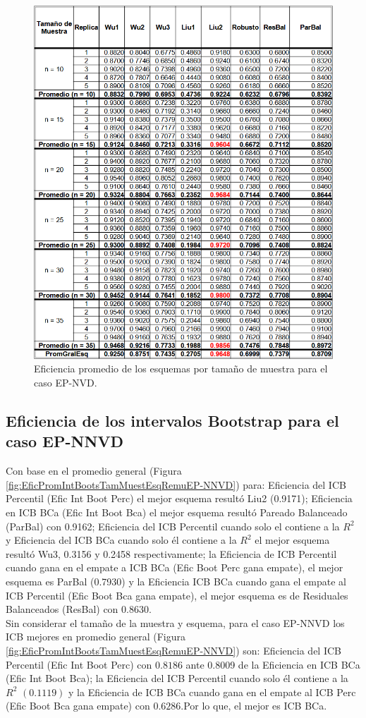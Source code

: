 \begin{figure}[ht] 
	\centering 
	\includegraphics[width=0.70\linewidth]{img/EP_NVD_Efic_Esq.png} 
	\caption{Eficiencia promedio de los esquemas por tamaño de muestra para el caso EP-NVD.} 
	\label{fig:EficPromEsqTamMuesEsqRemuEP-NVD}
\end{figure}
\FloatBarrier



\subsection{Eficiencia de los intervalos Bootstrap para el caso EP-NNVD}
Con base en el promedio general (Figura \ref{fig:EficPromIntBootsTamMuestEsqRemuEP-NNVD}) para: Eficiencia del ICB Percentil (Efic Int Boot Perc) el mejor esquema resultó Liu2 (0.9171); 
Eficiencia en ICB BCa (Efic Int Boot Bca) el mejor esquema resultó Pareado Balanceado (ParBal) con 0.9162;
 Eficiencia del ICB Percentil cuando solo el contiene a la $R^{2}$ y Eficiencia del ICB BCa cuando solo él contiene a la $R^{2}$ el mejor esquema resultó Wu3, 0.3156 y 0.2458 respectivamente;
 la Eficiencia de ICB Percentil cuando gana en el empate a ICB BCa (Efic Boot Perc gana empate), el mejor esquema es ParBal (0.7930) y la Eficiencia ICB BCa cuando gana el empate al ICB Percentil (Efic Boot Bca gana empate), el mejor esquema es de Residuales Balanceados (ResBal) con 0.8630.\\


Sin considerar el tamaño de la muestra y esquema, para el caso EP-NNVD los ICB mejores en promedio general  (Figura \ref{fig:EficPromIntBootsTamMuestEsqRemuEP-NNVD}) son: Eficiencia del ICB Percentil (Efic Int Boot Perc) con $0.8186$ ante 0.8009 de la Eficiencia en ICB BCa (Efic Int Boot Bca); la Eficiencia del ICB Percentil cuando solo él contiene a la $R^{2}$ $(0.1119)$ y la Eficiencia de ICB BCa cuando gana en el empate al ICB Perc (Efic Boot Bca gana empate) con $0.6286$.Por lo que, el mejor es ICB BCa.\\

